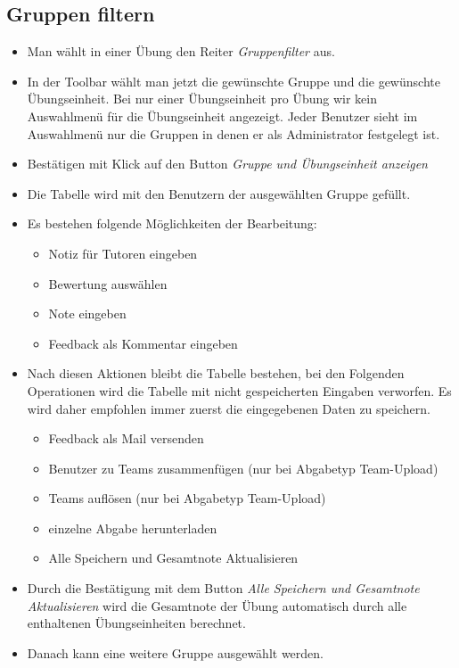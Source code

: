 \subsection*{Gruppen filtern}
\begin{itemize}
	\item Man wählt in einer Übung den Reiter \textit{Gruppenfilter} aus.
	\item In der Toolbar wählt man jetzt die gewünschte Gruppe und die gewünschte Übungseinheit. Bei nur einer Übungseinheit pro Übung wir kein Auswahlmenü für die Übungseinheit angezeigt. Jeder Benutzer sieht im Auswahlmenü nur die Gruppen in denen er als Administrator festgelegt ist.
	\item Bestätigen mit Klick auf den Button \textit{Gruppe und Übungseinheit anzeigen}
	\item Die Tabelle wird mit den Benutzern der ausgewählten Gruppe gefüllt.
	\item Es bestehen folgende Möglichkeiten der Bearbeitung: 
	\begin{itemize}
		\item Notiz für Tutoren eingeben
		\item Bewertung auswählen
		\item Note eingeben
		\item Feedback als Kommentar eingeben
		
	\end{itemize}
	\item Nach diesen Aktionen bleibt die Tabelle bestehen, bei den Folgenden Operationen wird die Tabelle mit nicht gespeicherten Eingaben verworfen. Es wird daher empfohlen immer zuerst die eingegebenen Daten zu speichern.
	\begin{itemize}
		\item Feedback als Mail versenden
		\item Benutzer zu Teams zusammenfügen (nur bei Abgabetyp Team-Upload)
		\item Teams auflösen (nur bei Abgabetyp Team-Upload)
		\item einzelne Abgabe herunterladen
		\item Alle Speichern und Gesamtnote Aktualisieren
	\end{itemize}
	\item Durch die Bestätigung mit dem Button \textit{Alle Speichern und Gesamtnote Aktualisieren} wird die Gesamtnote der Übung automatisch durch alle enthaltenen Übungseinheiten berechnet.
	\item Danach kann eine weitere Gruppe ausgewählt werden.
\end{itemize}

\clearpage